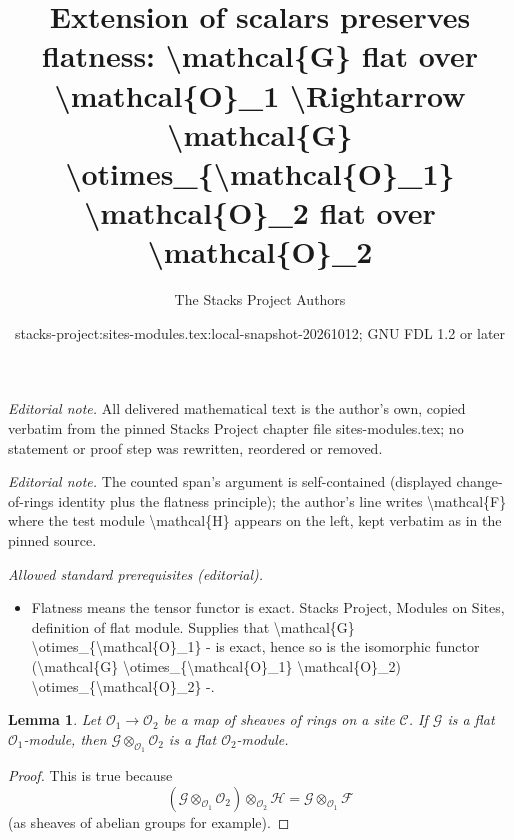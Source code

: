 \documentclass[10pt,a4paper]{amsart}
\title{Extension of scalars preserves flatness: \textbackslash{}mathcal\{G\} flat over \textbackslash{}mathcal\{O\}\_1 \textbackslash{}Rightarrow \textbackslash{}mathcal\{G\} \textbackslash{}otimes\_\{\textbackslash{}mathcal\{O\}\_1\} \textbackslash{}mathcal\{O\}\_2 flat over \textbackslash{}mathcal\{O\}\_2}
\author{The Stacks Project Authors}
\date{stacks-project:sites-modules.tex:local-snapshot-20261012; GNU FDL 1.2 or later}
\theoremstyle{plain}
\newtheorem{lemma}[subsection]{Lemma}
\theoremstyle{definition}
\theoremstyle{remark}
\numberwithin{equation}{subsection}
\begin{document}
\maketitle
\noindent\textit{Editorial note.} All delivered mathematical text is the author's own, copied verbatim from the pinned Stacks Project chapter file sites-modules.tex; no statement or proof step was rewritten, reordered or removed.\par\medskip
\noindent\textit{Editorial note.} The counted span's argument is self-contained (displayed change-of-rings identity plus the flatness principle); the author's line writes \textbackslash{}mathcal\{F\} where the test module \textbackslash{}mathcal\{H\} appears on the left, kept verbatim as in the pinned source.\par\medskip
\noindent\textit{Allowed standard prerequisites (editorial).}\begin{itemize}
\item Flatness means the tensor functor is exact. Stacks Project, Modules on Sites, definition of flat module. Supplies that \textbackslash{}mathcal\{G\} \textbackslash{}otimes\_\{\textbackslash{}mathcal\{O\}\_1\} - is exact, hence so is the isomorphic functor (\textbackslash{}mathcal\{G\} \textbackslash{}otimes\_\{\textbackslash{}mathcal\{O\}\_1\} \textbackslash{}mathcal\{O\}\_2) \textbackslash{}otimes\_\{\textbackslash{}mathcal\{O\}\_2\} -.
\end{itemize}\medskip
\begin{lemma}
\label{lemma-flat-change-of-rings}
Let $\mathcal{O}_1 \to \mathcal{O}_2$ be a map of sheaves
of rings on a site $\mathcal{C}$. If $\mathcal{G}$ is a
flat $\mathcal{O}_1$-module, then
$\mathcal{G} \otimes_{\mathcal{O}_1} \mathcal{O}_2$
is a flat $\mathcal{O}_2$-module.
\end{lemma}

\begin{proof}
This is true because
$$
(\mathcal{G} \otimes_{\mathcal{O}_1} \mathcal{O}_2)
\otimes_{\mathcal{O}_2} \mathcal{H}
=
\mathcal{G} \otimes_{\mathcal{O}_1} \mathcal{F}
$$
(as sheaves of abelian groups for example).
\end{proof}
\end{document}
